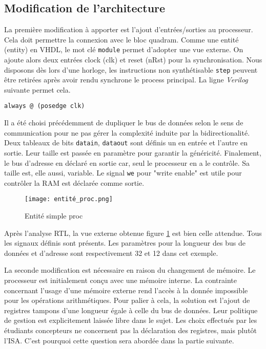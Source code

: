 \subsection{Modification de l'architecture}
La première modification à apporter est l'ajout d'entrées/sorties au processeur.
Cela doit permettre la connexion avec le bloc quadram.
Comme une entité (entity) en VHDL, le mot clé \texttt{module} permet d'adopter une vue externe.
On ajoute alors deux entrées clock (clk) et reset (nRst) pour la synchronisation.
Nous disposons dès lors d'une horloge, les instructions non synthétisable \texttt{step} peuvent être retirées après avoir rendu synchrone le process principal. La ligne \textit{Verilog} suivante permet cela.
\begin{lstlisting}[style=vhdl]
    always @ (posedge clk)
\end{lstlisting}
Il a été choisi précédemment de dupliquer le bus de données selon le sens de communication pour ne pas gérer la complexité induite par la bidirectionalité. Deux tableaux de bits \texttt{datain}, \texttt{dataout} sont définis un en entrée et l'autre en sortie. Leur taille est passée en paramètre pour garantir la généricité. Finalement, le bus d'adresse en déclaré en sortie car, seul le processeur en a le contrôle. Sa taille est, elle aussi, variable.
Le signal \texttt{we} pour "write enable" est utile pour contrôler la \gls{RAM} est déclarée comme sortie.
\begin{figure}[h]
    \centering
    \texttt{[image: entité\_proc.png]}
    \caption{Entité simple proc}
    \label{entity_proc}
\end{figure}

Après l'analyse RTL, la vue externe obtenue figure \ref{entity_proc} est bien celle attendue.
Tous les signaux définis sont présents. Les paramètres pour la longueur des bus de données et d'adresse sont respectivement 32 et 12 dans cet exemple. \\
\gap

La seconde modification est nécessaire en raison du changement de mémoire.
Le processeur est initialement conçu avec une mémoire interne.
La contrainte concernant l'usage d'une mémoire externe rend l'accès à la donnée impossible pour les opérations arithmétiques.
Pour palier à cela, la solution est l'ajout de registres tampons d'une longueur égale à celle du bus de données.
Leur politique de gestion est explicitement laissée libre dans le sujet.
Les choix effectués par les étudiants concepteurs ne concernent pas la déclaration des registres, mais plutôt l'\gls{ISA}.
C'est pourquoi cette question sera abordée dans la partie suivante. \\
\gap

